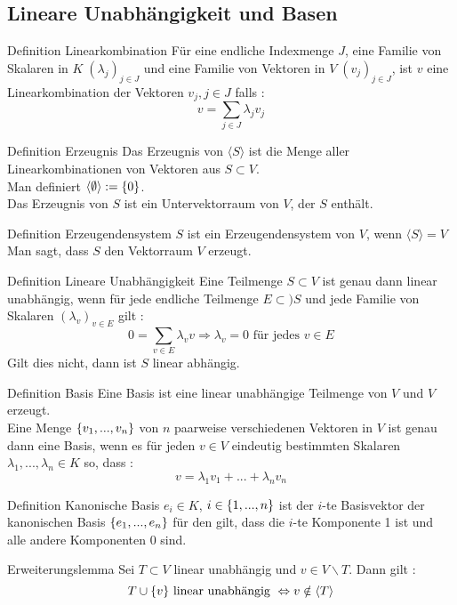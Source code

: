 \documentclass[main.tex]{subfiles}
\begin{document}
\subsection*{Lineare Unabhängigkeit und Basen}
\begin{karte}{Definition Linearkombination}
    Für eine endliche Indexmenge \(J\), eine Familie von Skalaren in 
    \(K \;(\lambda_j)_{j \in J}\) und eine Familie von Vektoren in 
    \(V \; (v_j)_{j \in J}\), ist \(v\) eine Linearkombination der 
    Vektoren \(v_j, j \in J\) falls : 
    \[v = \sum_{j \in J} \lambda_j v_j \]
\end{karte}
\begin{karte}{Definition Erzeugnis}
    Das Erzeugnis von \(\langle S \rangle \) ist die Menge 
    aller Linearkombinationen von Vektoren aus \(S \subset V\). \\
    Man definiert \(\langle \emptyset \rangle : = \{0\}\). \\
    Das Erzeugnis von \(S\) ist ein Untervektorraum von \(V\), 
    der \(S\) enthält.
\end{karte}
\begin{karte}{Definition Erzeugendensystem}
    \(S\) ist ein Erzeugendensystem von \(V\), wenn \(\langle S \rangle = V\)\\
    Man sagt, dass \(S\) den Vektorraum \(V\) erzeugt.
\end{karte}
\begin{karte}{Definition Lineare Unabhängigkeit}
    Eine Teilmenge \(S \subset V\) ist genau dann linear unabhängig,
    wenn für jede endliche Teilmenge \(E \subset) S\) 
    und jede Familie von Skalaren \( (\lambda_v)_{v \in E}\) gilt : 
    \[0 = \sum_{v \in E} \lambda_v v \Rightarrow \lambda_v = 0 
    \text{ für jedes } v \in E\]
    Gilt dies nicht, dann ist \(S\) linear abhängig.
\end{karte}
\begin{karte}{Definition Basis}
    Eine Basis ist eine linear unabhängige Teilmenge von \(V\) und 
    \(V\) erzeugt. \\
    Eine Menge \(\{v_1, ... ,v_n\}\) von \(n\) paarweise verschiedenen 
    Vektoren in \(V\) ist genau dann eine Basis, wenn es für jeden \(v \in V\)
    eindeutig bestimmten Skalaren \(\lambda_1, ... , \lambda_n \in K\)
    so, dass : 
    \[v = \lambda_1 v_1 + ... + \lambda_n v_n\]
\end{karte}
\begin{karte}{Definition Kanonische Basis}
    \(e_i \in K\), \(i \in \{1, ... , n\}\) ist der \(i\)-te Basisvektor
    der kanonischen Basis \(\{e_1, ... ,e_n\}\) für den gilt, dass die 
    \(i\)-te Komponente 1 ist und alle andere Komponenten \(0\) sind.
\end{karte}
\begin{karte}{Erweiterungslemma}
    Sei \(T \subset V\) linear unabhängig und \(v \in V \backslash T \). Dann gilt : 
    \[T \cup \{v\} \text{ linear unabhängig } 
    \Leftrightarrow v \notin \langle T \rangle \]
\end{karte}
\end{document}

